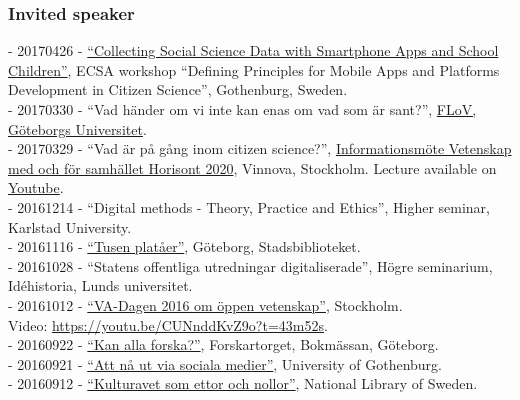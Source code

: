 \documentclass[a4paper,11pt,oneside]{article}
\begin{document}
{    \subsubsection{Invited speaker}
    - 20170426 - \href{https://ecsa.citizen-science.net/sites/default/files/draft_agenda_second_workshop_appsplatforms.pdf}{``Collecting Social Science Data with Smartphone Apps and School Children''}, ECSA workshop ``Defining Principles for Mobile Apps and Platforms Development in Citizen Science'', Gothenburg, Sweden. \\
    - 20170330 - ``Vad händer om vi inte kan enas om vad som är sant?'', \href{http://flov.gu.se/aktuellt/Nyheter/fulltext//oppet-hus-pa-flov-med-panelsamtal-om-alternativa-fakta-och-informationsbubblor.cid1428426}{FLoV, Göteborgs Universitet}.\\
    - 20170329 - ``Vad är på gång inom citizen science?'', \href{http://www.vinnova.se/sv/Aktuellt--publicerat/Kalendarium/2017/170329-Informationsmote-Vetenskap-med-och-for-samhallet/}{Informationsmöte Vetenskap med och för samhället Horisont 2020}, Vinnova, Stockholm. Lecture available on \href{https://youtu.be/HHW0j7Zo5E0}{Youtube}.\\
    - 20161214 - ``Digital methods - Theory, Practice and Ethics'', Higher seminar, Karlstad University.\\
    - 20161116 - \href{http://www.stadsbiblioteket.nu/tusen-plataer/}{``Tusen platåer''}, Göteborg, Stadsbiblioteket.\\
    - 20161028 - ``Statens offentliga utredningar digitaliserade'', Högre seminarium, Idéhistoria, Lunds universitet.\\
    - 20161012 - \href{https://v-a.se/events/va-dagen-2016/}{``VA-Dagen 2016 om öppen vetenskap''}, Stockholm. \\Video: \href{https://youtu.be/CUNnddKvZ9o?t=43m52s}{https://youtu.be/CUNnddKvZ9o?t=43m52s}.\\
    - 20160922 - \href{http://flov.gu.se/aktuellt/Nyheter/fulltext//sju-filosofer-forelaser-pa-bokmassan-.cid1403852}{``Kan alla forska?''}, Forskartorget, Bokmässan, Göteborg. \\
    - 20160921 - \href{http://kompetensutveckling.adm.gu.se/seminar/detail/2260}{``Att nå ut via sociala medier''}, University of Gothenburg. \\
    - 20160912 - \href{http://www.kb.se/aktuellt/utbildningar/2016/Kulturarvet-som-ettor-och-nollor--Del-3-Digital-humaniora/}{``Kulturavet som ettor och nollor''}, National Library of Sweden.\\
}
\end{document}
